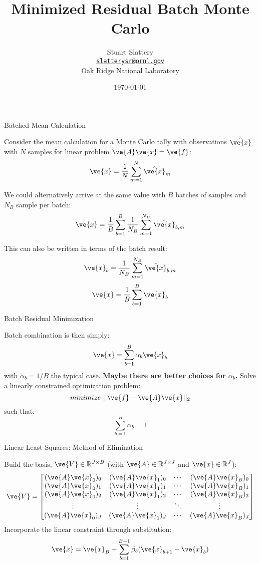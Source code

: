 \documentclass{beamer}
\author[Stuart Slattery]{Stuart Slattery\\
  \bigskip
  \href{mailto:slatterysr@ornl.gov}{\texttt{slatterysr@ornl.gov}} \\
  \bigskip
  Oak Ridge National Laboratory}
\date{\today}
\title[MRB Monte Carlo \hspace{1mm}
  \insertframenumber/\inserttotalframenumber]{Minimized Residual Batch
Monte Carlo}
\begin{document}
\maketitle

\begin{frame}{Batched Mean Calculation}

  Consider the mean calculation for a Monte Carlo tally with
  observations $\hat{\ve{x}}$ with $N$ samples for linear problem
  $\ve{A}\ve{x}=\ve{f}$:
  \[
  \ve{x} = \frac{1}{N} \sum_{m=1}^N \hat{\ve{x}}_m
  \]

  We could alternatively arrive at the same value with $B$ batches of
  samples and $N_B$ sample per batch:
  \[
  \ve{x} = \frac{1}{B} \sum_{b=1}^B \frac{1}{N_B} \sum_{m=1}^{N_B}
  \hat{\ve{x}}_{b,m}
  \]

  This can also be written in terms of the batch result:
  \[
  \ve{x}_b=\frac{1}{N_B} \sum_{m=1}^{N_B} \hat{\ve{x}}_{b,m}
  \]
  \[
  \ve{x} = \frac{1}{B}\sum_{b=1}^B \ve{x}_b
  \]

\end{frame}

\begin{frame}{Batch Residual Minimization}

  Batch combination is then simply:
  \[
  \ve{x} = \sum_{b=1}^B \alpha_b \ve{x}_b
  \]
  with $\alpha_b = 1/B$ the typical case. \textbf{Maybe there are
    better choices for $\alpha_b$.} Solve a linearly constrained
  optimization problem:
  \[
  minimize\ ||\ve{f} - \ve{A}\ve{x}||_2
  \]
  such that:
  \[
  \sum_{b=1}^B \alpha_b = 1
  \]

\end{frame}

\begin{frame}{Linear Least Squares: Method of Elimination}

  Build the basis, $\ve{V} \in \mathbb{R}^{J \times B}$ (with $\ve{A}
  \in \mathbb{R}^{J \times J}$ and $\ve{x} \in \mathbb{R}^{J}$):
  \[
  \ve{V} = 
  \begin{bmatrix}
    (\ve{A}\ve{x}_0)_0 & (\ve{A}\ve{x}_1)_0 & \cdots & (\ve{A}\ve{x}_B)_0 \\
    (\ve{A}\ve{x}_0)_1 & (\ve{A}\ve{x}_1)_1 & \cdots & (\ve{A}\ve{x}_B)_1 \\
    (\ve{A}\ve{x}_0)_2 & (\ve{A}\ve{x}_1)_2 & \cdots & (\ve{A}\ve{x}_B)_2 \\
    \vdots             & \vdots            & \ddots & \vdots \\
    (\ve{A}\ve{x}_0)_J & (\ve{A}\ve{x}_1)_J & \cdots & (\ve{A}\ve{x}_B)_J \\
  \end{bmatrix}
  \]
  Incorporate the linear constraint through substitution:
  \[
  \ve{x} = \ve{x}_B + \sum_{b=1}^{B-1} \beta_b (\ve{x}_{b+1} - \ve{x}_b)
  \]
  
\end{frame}
\end{document}
